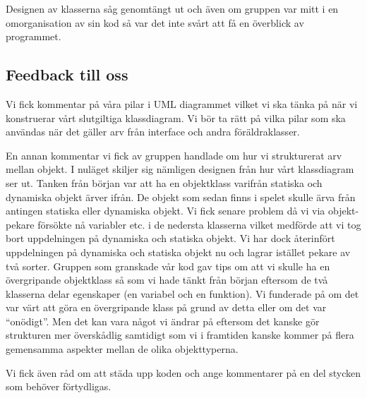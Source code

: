 \documentclass{TDP005mall}
\begin{document}
Designen av klasserna såg genomtängt ut och  även om gruppen var mitt i en
omorganisation av sin kod så var det inte svårt att få en överblick av
programmet.

\subsection{Feedback till oss}
Vi fick kommentar på våra pilar i UML diagrammet vilket vi ska tänka på när vi
konstruerar vårt slutgiltiga klassdiagram. Vi bör ta rätt på vilka pilar som ska användas när det gäller arv från interface och andra föräldraklasser.

En annan kommentar vi fick av gruppen handlade om hur vi strukturerat arv mellan objekt. I nuläget skiljer sig nämligen designen från hur vårt klassdiagram ser ut. Tanken från början var att ha en objektklass varifrån statiska och dynamiska objekt ärver ifrån. De objekt som sedan finns i spelet skulle ärva från antingen statiska eller dynamiska objekt. Vi fick senare problem då vi via objekt-pekare försökte nå variabler etc. i de nedersta klasserna vilket medförde att vi tog bort uppdelningen på dynamiska och statiska objekt. Vi har dock återinfört uppdelningen på dynamiska och statiska objekt nu och lagrar istället pekare av två sorter. Gruppen som granskade vår kod gav tips om att vi skulle ha en övergripande objektklass så som vi hade tänkt från början eftersom de två klasserna delar egenskaper (en variabel och en funktion). Vi funderade på om det var värt att göra en övergripande klass på grund av detta eller om det var ``onödigt''. Men det kan vara något vi ändrar på eftersom det kanske gör strukturen mer överskådlig samtidigt som vi i framtiden kanske kommer på flera gemensamma aspekter mellan de olika objekttyperna.

Vi fick även råd om att städa upp koden och ange kommentarer på en del stycken som behöver förtydligas. 
\end{document}
